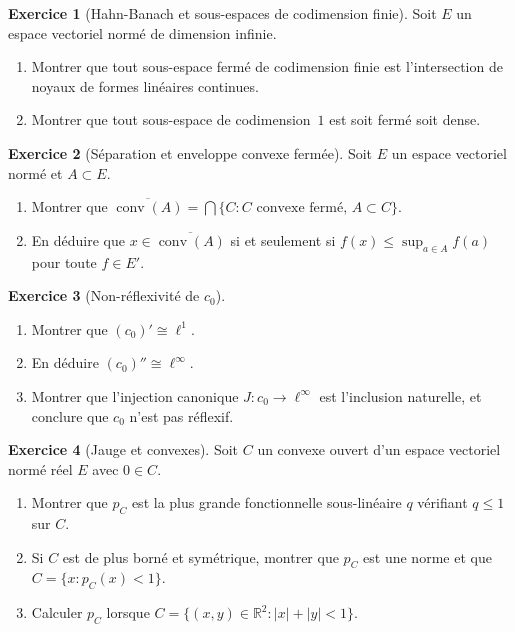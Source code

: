 \documentclass[a4paper,12pt]{book}
\DeclareMathOperator{\conv}{conv}
\newcommand{\R}{\mathbb{R}}
\newcommand{\abs}[1]{\left| #1 \right|}
\theoremstyle{definition}
\newtheorem{exercice}{Exercice}[chapter]
\theoremstyle{plain}
\theoremstyle{remark}
\begin{document}
\begin{exercice}[Hahn-Banach et sous-espaces de codimension finie]\label{exo:codim-finie}
Soit $E$ un espace vectoriel normé de dimension infinie.
\begin{enumerate}[label=(\alph*)]
    \item Montrer que tout sous-espace fermé de codimension finie est l'intersection
          de noyaux de formes linéaires continues.
    \item Montrer que tout sous-espace de codimension~$1$ est soit fermé soit dense.
\end{enumerate}
\end{exercice}

\begin{exercice}[Séparation et enveloppe convexe fermée]\label{exo:conv-fermee}
Soit $E$ un espace vectoriel normé et $A \subset E$.
\begin{enumerate}[label=(\alph*)]
    \item Montrer que $\overline{\conv(A)} = \bigcap\{C : C \text{ convexe fermé},\,
          A \subset C\}$.
    \item En déduire que $x \in \overline{\conv(A)}$ si et seulement si $f(x) \leq
          \sup_{a \in A} f(a)$ pour toute $f \in E'$.
\end{enumerate}
\end{exercice}

\begin{exercice}[Non-réflexivité de $c_0$]\label{exo:c0-non-reflexif}
\begin{enumerate}[label=(\alph*)]
    \item Montrer que $(c_0)' \cong \ell^1$.
    \item En déduire $(c_0)'' \cong \ell^\infty$.
    \item Montrer que l'injection canonique $J : c_0 \to \ell^\infty$ est l'inclusion
          naturelle, et conclure que $c_0$ n'est pas réflexif.
\end{enumerate}
\end{exercice}

\begin{exercice}[Jauge et convexes]\label{exo:jauge}
Soit $C$ un convexe ouvert d'un espace vectoriel normé réel $E$ avec $0 \in C$.
\begin{enumerate}[label=(\alph*)]
    \item Montrer que $p_C$ est la plus grande fonctionnelle sous-linéaire $q$ vérifiant
          $q \leq 1$ sur $C$.
    \item Si $C$ est de plus borné et symétrique, montrer que $p_C$ est une norme et
          que $C = \{x : p_C(x) < 1\}$.
    \item Calculer $p_C$ lorsque $C = \{(x,y) \in \R^2 : \abs{x} + \abs{y} < 1\}$.
\end{enumerate}
\end{exercice}
\end{document}
